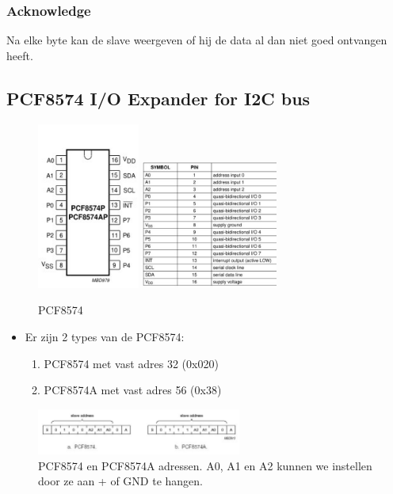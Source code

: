 \documentclass{article}
\begin{document}
\subsubsection{Acknowledge}
Na elke byte kan de slave weergeven of hij de data al dan niet goed ontvangen heeft.

\subsection{PCF8574 I/O Expander for I2C bus}

\begin{figure}[H]
    \centering
    \includegraphics[width=0.3\textwidth]{pcf.png}
    \includegraphics[width=0.4\textwidth]{pcf-pins.png}
    \caption{PCF8574}
\end{figure}

\begin{itemize}
    \item Er zijn 2 types van de PCF8574:
    \begin{enumerate}
        \item PCF8574 met vast adres 32 (0x020)
        \item PCF8574A met vast adres 56 (0x38)
    \end{enumerate}
\end{itemize}

\begin{figure}[H]
    \centering
    \includegraphics[width=0.6\textwidth]{pcf-adres.png}
    \caption{PCF8574 en PCF8574A adressen. A0, A1 en A2 kunnen we instellen door ze aan + of GND te hangen.}
\end{figure}
\end{document}
